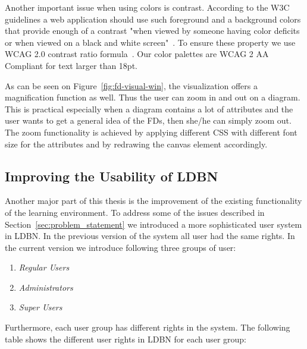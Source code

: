 
Another important issue when using colors is contrast. 
According to the W3C guidelines a web application should use such
foreground and a background colors that provide enough of a
contrast "when viewed by someone having color deficits or when viewed on a black and white screen"~\cite{w3c1}.
To ensure these property we use WCAG 2.0 contrast ratio formula~\cite{w3c2}.
Our color palettes are WCAG 2 AA Compliant for text larger than 18pt.

As can be seen on Figure~\ref{fig:fd-visual-win}, 
the visualization offers a magnification function as well. 
Thus the user can zoom in and out on a diagram.
This is practical especially when a
diagram contains a lot of attributes and the user 
wants to get a general idea of the FDs, then she/he can
simply zoom out.  
The zoom functionality
is achieved by applying different CSS with different font 
size for the attributes and by redrawing the canvas element accordingly. 

\subsection{Improving the Usability of LDBN}
\label{sec:improving}

Another major part of this thesis is the improvement of the
existing functionality of the learning environment. 
To address some of the issues described in 
Section~\ref{sec:problem_statement} we introduced a more sophisticated user system in 
LDBN. In the previous version of the system all user had the same rights. 
In the current version we introduce following three groups of user:
\begin{enumerate}
	\item \emph{Regular Users}
	\item \emph{Administrators}
	\item \emph{Super Users}
\end{enumerate}

Furthermore, each user group has different rights in the system. 
The following table shows the different user rights in LDBN for each user group: 

